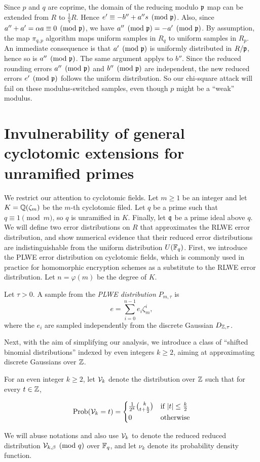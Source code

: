 \documentclass{amsart}
\begin{document}
Since $p$ and $q$ are coprime, the domain of the reducing modulo $\mathfrak{p}$ map can be extended from $R$ to $\frac{1}{q}R$. Hence $e' \equiv - b'' + a'' s \pmod{\mathfrak{p}}$. Also, since $a'' + a' = \alpha a \equiv 0 \pmod {\mathfrak{p}}$, we have $a'' \pmod{\mathfrak{p}} = -a' \pmod{\mathfrak{p}}$. By assumption, the map $\pi_{q,p}$ algorithm maps uniform samples in $R_q$ to uniform samples in $R_p$. An immediate consequence is that $a' \pmod{\mathfrak{p}}$ is uniformly distributed in $R/\mathfrak{p}$, hence so is $a'' \pmod{\mathfrak{p}}$. The same argument applys to $b''$. Since the reduced rounding errors $a'' \pmod{\mathfrak{p}}$ and $b'' \pmod{\mathfrak{p}}$ are independent, the new reduced errors $e' \pmod{\mathfrak{p}}$ follows the uniform distribution. So our chi-square attack will fail on these modulus-switched samples, even though $p$ might be a ``weak'' modulus.


\section{Invulnerability of general cyclotomic extensions for unramified primes}
\label{sec: cyclo-secure}

We restrict our attention to cyclotomic fields. Let $m \geq 1$ be an integer and let $K = \mathbb{Q}(\zeta_m)$ be the $m$-th cyclotomic filed. Let $q$ be a prime such that
$q \equiv 1\pmod{m}$, so $q$ is unramified in $K$. Finally, let $\mathfrak{q}$ be a prime ideal above $q$. We will define two error distributions on $R$ that approximates the RLWE error distribution, and show numerical evidence that their reduced error distributions are indistinguishable from the uniform distribution $U(\mathbb{F}_q)$. First, we introduce the PLWE error distribution on cyclotomic fields, which is commonly used in practice for homomorphic encryption schemes as a substitute to the RLWE error distribution. Let $n = \varphi(m)$ be the degree of $K$.
\begin{Definition}
Let $\tau > 0$. A sample from the {\it PLWE distribution} $P_{m,\tau}$ is
\[
    e = \sum_{i=0}^{n-1} e_i \zeta_m^i,
\]
where the $e_i$ are sampled independently from the discrete Gaussian $D_{\mathbb{Z},\tau}$.
\end{Definition}

Next, with the aim of simplifying our analysis, we introduce a class of ``shifted binomial distributions'' indexed by even integers $k \geq 2$, aiming at approximating discrete Gaussians over $\mathbb{Z}$.
\begin{Definition}
For an even integer $k \geq 2$, let $\mathcal{V}_{k}$ denote the distribution over $\mathbb{Z}$ such that for every $t \in \mathbb{Z}$,

$$\operatorname{Prob}(\mathcal{V}_{k} = t) =  \begin{cases} \frac{1}{2^k}{k \choose t+\frac{k}{2}} &\mbox{if } |t| \leq \frac{k}{2} \\
0 & \mbox{otherwise}  \end{cases}$$

\end{Definition}
We will abuse notations and also use $\mathcal{V}_{k}$ to denote the reduced reduced distribution $\mathcal{V}_{k,\beta} \pmod {q}$ over $\mathbb{F}_q$, and let $\nu_{k}$ denote its probability density function.
\end{document}
